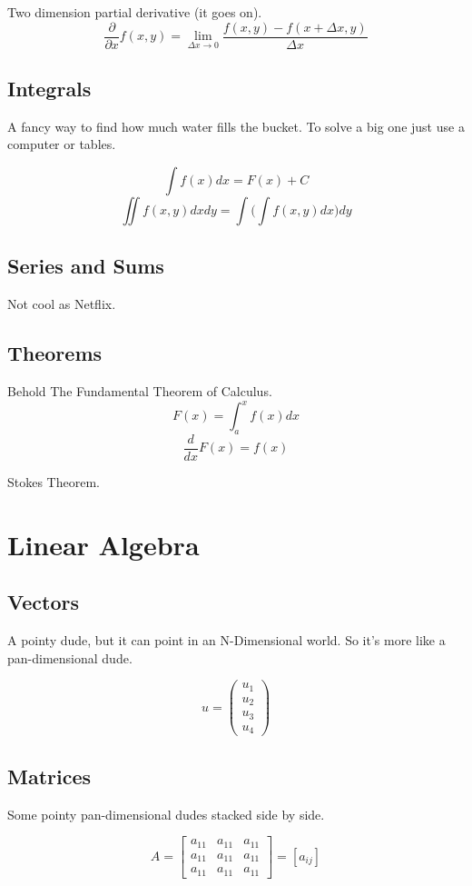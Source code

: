 Two dimension partial derivative (it goes on).
$$\frac{\partial}{\partial x}f(x, y) = \lim_{\Delta x \to 0} \frac{f(x, y) - f(x+\Delta x,y)}{\Delta x}$$

\subsection{Integrals}

A fancy way to find how much water fills the bucket.
To solve a big one just use a computer or tables.

$$\int f(x) dx = F(x) + C$$
$$\iint f(x,y) dxdy = \int \Big(\int f(x,y) dx\Big) dy$$

\subsection{Series and Sums}
Not cool as Netflix.

\subsection{Theorems}
Behold The Fundamental Theorem of Calculus.
$$F(x) = \int_a^x f(x) dx$$
$$\frac{d}{dx}F(x) = f(x)$$

Stokes Theorem.

\section{Linear Algebra}
\subsection{Vectors}

A pointy dude, but it can point in an N-Dimensional world.
So it's more like a pan-dimensional dude.

$$ u = 
\begin{pmatrix}
u_{1} \\ u_{2} \\ u_{3} \\ u_{4}
\end{pmatrix}
$$

\subsection{Matrices}

Some pointy pan-dimensional dudes stacked side by side.

$$ A = 
\begin{bmatrix}
a_{11} & a_{11} & a_{11} \\
a_{11} & a_{11} & a_{11} \\
a_{11} & a_{11} & a_{11} 
\end{bmatrix} = [a_{ij}]
$$

